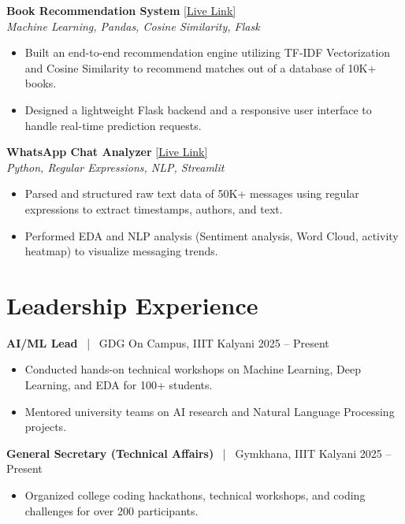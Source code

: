 \documentclass[10pt,letterpaper]{article}
\begin{document}
\noindent \textbf{Book Recommendation System} \hfill \href{https://book-recommender-system-5olv.onrender.com/}{[Live Link]} \\
\textit{Machine Learning, Pandas, Cosine Similarity, Flask}
\begin{itemize}
    \item Built an end-to-end recommendation engine utilizing TF-IDF Vectorization and Cosine Similarity to recommend matches out of a database of 10K+ books.
    \item Designed a lightweight Flask backend and a responsive user interface to handle real-time prediction requests.
\end{itemize}

\noindent \textbf{WhatsApp Chat Analyzer} \hfill \href{https://whatsappanalyser-7mxtgbpbvxsytrdynkujd5.streamlit.app/}{[Live Link]} \\
\textit{Python, Regular Expressions, NLP, Streamlit}
\begin{itemize}
    \item Parsed and structured raw text data of 50K+ messages using regular expressions to extract timestamps, authors, and text.
    \item Performed EDA and NLP analysis (Sentiment analysis, Word Cloud, activity heatmap) to visualize messaging trends.
\end{itemize}

\section{Leadership Experience}
\noindent \textbf{AI/ML Lead} \ | \ GDG On Campus, IIIT Kalyani \hfill 2025 -- Present
\begin{itemize}
    \item Conducted hands-on technical workshops on Machine Learning, Deep Learning, and EDA for 100+ students.
    \item Mentored university teams on AI research and Natural Language Processing projects.
\end{itemize}

\noindent \textbf{General Secretary (Technical Affairs)} \ | \ Gymkhana, IIIT Kalyani \hfill 2025 -- Present
\begin{itemize}
    \item Organized college coding hackathons, technical workshops, and coding challenges for over 200 participants.
\end{itemize}
\end{document}
